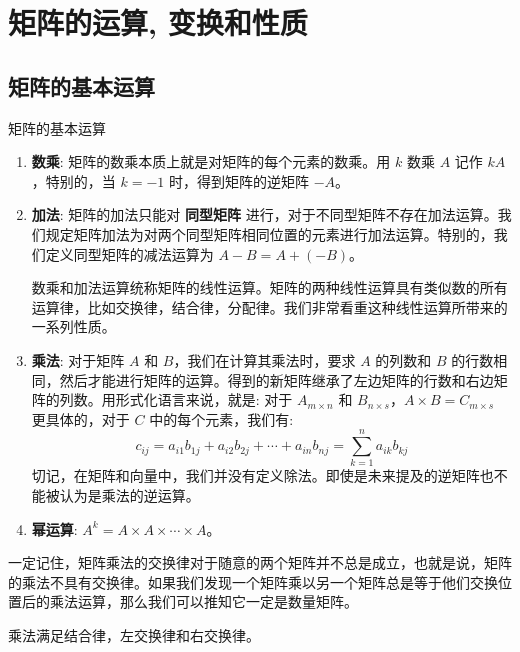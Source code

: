 \documentclass[a4paper,12pt]{ctexart}
\begin{document}
\newpage

\section{矩阵的运算, 变换和性质}

\subsection{矩阵的基本运算}

\begin{mydef}{矩阵的基本运算}{}
\begin{enumerate}
    \item \textbf{数乘}: 矩阵的数乘本质上就是对矩阵的每个元素的数乘。用 $k$ 数乘 $A$ 记作 $kA$，特别的，当 $k=-1$ 时，得到矩阵的逆矩阵 $-A$。
    
    \item \textbf{加法}: 矩阵的加法只能对 \textbf{同型矩阵} 进行，对于不同型矩阵不存在加法运算。我们规定矩阵加法为对两个同型矩阵相同位置的元素进行加法运算。特别的，我们定义同型矩阵的减法运算为 $A-B=A+(-B)$。
    
    数乘和加法运算统称矩阵的线性运算。矩阵的两种线性运算具有类似数的所有运算律，比如交换律，结合律，分配律。我们非常看重这种线性运算所带来的一系列性质。
    
    \item \textbf{乘法}: 对于矩阵 $A$ 和 $B$，我们在计算其乘法时，要求 $A$ 的列数和 $B$ 的行数相同，然后才能进行矩阵的运算。得到的新矩阵继承了左边矩阵的行数和右边矩阵的列数。用形式化语言来说，就是: 对于 $A_{m \times n}$ 和 $B_{n \times s}$，$A \times B = C_{m \times s}$ 更具体的，对于 $C$ 中的每个元素，我们有:
    \[
    c_{ij} = a_{i1}b_{1j}+a_{i2}b_{2j}+ \cdots +a_{in}b_{nj} = \sum_{k=1}^{n} a_{ik}b_{kj}
    \]
    切记，在矩阵和向量中，我们并没有定义除法。即使是未来提及的逆矩阵也不能被认为是乘法的逆运算。
    
    \item \textbf{幂运算}: $A^k = A \times A \times \cdots \times A$。
\end{enumerate}
\end{mydef}

\begin{mynote}
    一定记住，矩阵乘法的交换律对于随意的两个矩阵并不总是成立，也就是说，矩阵的乘法不具有交换律。如果我们发现一个矩阵乘以另一个矩阵总是等于他们交换位置后的乘法运算，那么我们可以推知它一定是数量矩阵。
    
    乘法满足结合律，左交换律和右交换律。
\end{mynote}
\end{document}
